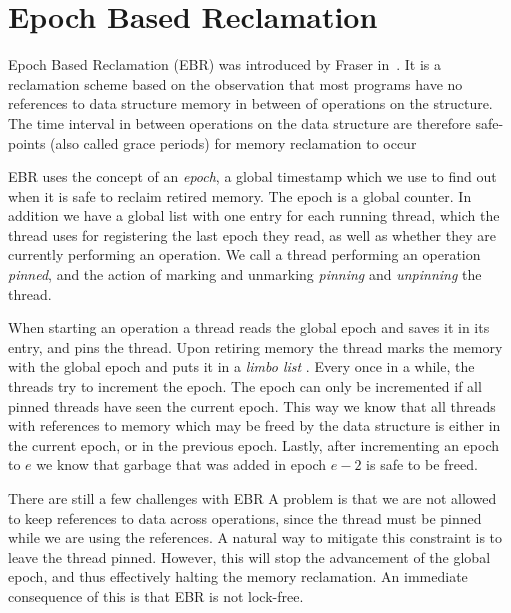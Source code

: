 \documentclass[b5paper]{report}
\begin{document}
\section{Epoch Based Reclamation}
Epoch Based Reclamation (EBR) was introduced by Fraser
in~\cite{fraser2004practical}. It is a reclamation scheme based on the
observation that most programs have no references to data structure memory in
between of operations on the structure. The time interval in between
operations on the data structure are therefore safe-points (also called grace
periods) for memory reclamation to occur 

EBR uses the concept of an \emph{epoch}, a global timestamp which we use to
find out when it is safe to reclaim retired memory. The epoch is a global
counter. In addition we have a global list with one entry for each running
thread, which the thread uses for registering the last epoch they read, as well
as whether they are currently performing an operation. We call a thread
performing an operation \emph{pinned}, and the action of marking and unmarking
\emph{pinning} and \emph{unpinning} the thread.

When starting an operation a thread reads the global epoch and saves it in its
entry, and pins the thread. Upon retiring memory the thread marks the memory
with the global epoch and puts it in a \emph{limbo list} . Every once in a while, the threads try to
increment the epoch. The epoch can only be incremented if all pinned threads
have seen the current epoch. This way we know that all threads with references
to memory which may be freed by the data structure is either in the current
epoch, or in the previous epoch. Lastly, after incrementing an epoch to $e$ we
know that garbage that was added in epoch $e-2$ is safe to be freed.


There are still a few challenges with EBR A problem is that we are not
allowed to keep references to data across operations, since the thread must be
pinned while we are using the references. A natural way to mitigate this
constraint is to leave the thread pinned. However, this will stop the
advancement of the global epoch, and thus effectively halting the memory
reclamation. An immediate consequence of this is that EBR is not lock-free.
\end{document}
